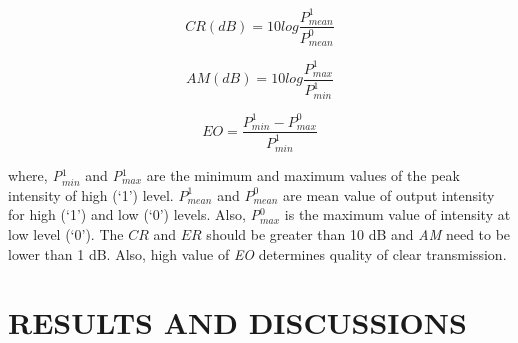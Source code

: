 \documentclass{osa-article}
\begin{document}
 \begin{equation}
CR(dB)=10log\frac{P^1_{mean}} {P^0_{mean}}
\label{eq:2}
\end{equation}

\begin{equation}
AM(dB)=10log\frac{P^1_{max}} {P^1_{min}}
\label{eq:3}
\end{equation}
 
\begin{equation}
EO=\frac{P^1_{min}-P^0_{max}} {P^1_{min}}
\label{eq:4}
\end{equation}

where, \textit {P$^1_{min}$} and \textit {P$^1_{max}$} are the minimum and maximum values of the peak intensity of high (`1') level. $P^1_{mean}$ and $P^0_{mean}$ are mean value of output intensity for high (`1') and low (`0') levels. Also, \textit {P$^0_{max}$} is the maximum value of intensity at low level (`0'). The $CR$ and $ER$ should be greater than 10 dB and \textit{AM} need to be lower than 1 dB. Also, high value of \textit{EO} determines quality of clear transmission.

\section{RESULTS AND DISCUSSIONS}
\label{}
\end{document}
